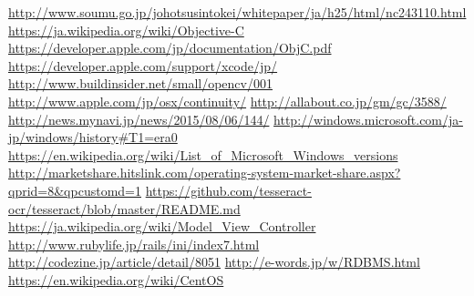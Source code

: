\def\line{-\hspace*{-.7zw}-}

\begin{thebibliography}{99}

\url{http://www.soumu.go.jp/johotsusintokei/whitepaper/ja/h25/html/nc243110.html}
\url{https://ja.wikipedia.org/wiki/Objective-C}
\url{https://developer.apple.com/jp/documentation/ObjC.pdf}
\url{https://developer.apple.com/support/xcode/jp/}
\url{http://www.buildinsider.net/small/opencv/001}
\url{http://www.apple.com/jp/osx/continuity/}
\url{http://allabout.co.jp/gm/gc/3588/}
\url{http://news.mynavi.jp/news/2015/08/06/144/}
\url{http://windows.microsoft.com/ja-jp/windows/history#T1=era0}
\url{https://en.wikipedia.org/wiki/List_of_Microsoft_Windows_versions}
\url{http://marketshare.hitslink.com/operating-system-market-share.aspx?qprid=8&qpcustomd=1}
\url{https://github.com/tesseract-ocr/tesseract/blob/master/README.md}
\url{https://ja.wikipedia.org/wiki/Model_View_Controller}
\url{http://www.rubylife.jp/rails/ini/index7.html}
\url{http://codezine.jp/article/detail/8051}
\url{http://e-words.jp/w/RDBMS.html}
\url{https://en.wikipedia.org/wiki/CentOS}

\end{thebibliography}